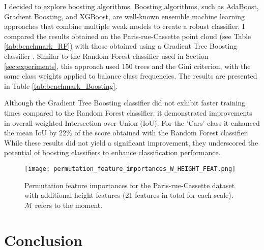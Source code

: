 \documentclass{article}
\begin{document}
I decided to explore boosting algorithms. Boosting algorithms, such as AdaBoost, Gradient Boosting, and XGBoost, are well-known ensemble machine learning approaches that combine multiple weak models to create a robust classifier. I compared the results obtained on the Paris-rue-Cassette point cloud (see Table \ref{tab:benchmark_RF}) with those obtained using a Gradient Tree Boosting classifier \cite{ke_lightgbm_2017}. Similar to the Random Forest classifier used in Section \ref{sec:experiments}, this approach used 150 trees and the Gini criterion, with the same class weights applied to balance class frequencies. The results are presented in Table \ref{tab:benchmark_Boosting}. 

Although the Gradient Tree Boosting classifier did not exhibit faster training times compared to the Random Forest classifier, it demonstrated improvements in overall weighted Intersection over Union (IoU). For the 'Cars' class it enhanced the mean IoU by 22\% of the score obtained with the Random Forest classifier. While these results did not yield a significant improvement, they underscored the potential of boosting classifiers to enhance classification performance.

\begin{figure}
    \hspace*{-2cm}
        \texttt{[image: permutation\_feature\_importances\_W\_HEIGHT\_FEAT.png]}
    \caption{Permutation feature importances for the Paris-rue-Cassette dataset with additional height features (21 features in total for each scale). $\mathcal{M}$ refers to the moment.}
    \label{fig:permutation_height}
\end{figure}

\section{Conclusion}
\end{document}
